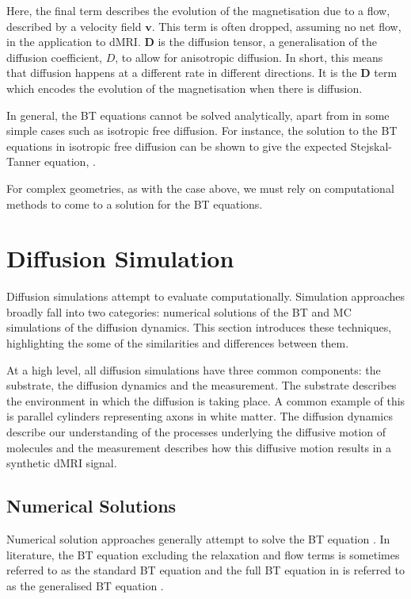 Here, the final term describes the evolution of the magnetisation due to a flow, described by a velocity field $\mathbf{v}$. This term is often dropped, assuming no net flow, in the application to \ac{dMRI}. 
$\mathbf{D}$ is the diffusion tensor, a generalisation of the diffusion coefficient, $D$, to allow for anisotropic diffusion. In short, this means that diffusion happens at a different rate in different directions.
It is the $\mathbf{D}$ term which encodes the evolution of the magnetisation when there is diffusion.

In general, the \ac{BT} equations cannot be solved analytically, apart from in some simple cases such as isotropic free diffusion.
For instance, the solution to the \ac{BT} equations in isotropic free diffusion can be shown to give the expected Stejskal-Tanner equation, .

For complex geometries, as with the case above, we must rely on computational methods to come to a solution for the \ac{BT} equations. 



\section{Diffusion Simulation}
\label{sec:diffusion_simulation}
Diffusion simulations attempt to evaluate  computationally. Simulation approaches broadly fall into two categories: numerical solutions of the \ac{BT} and \ac{MC} simulations of the diffusion dynamics. This section introduces these techniques, highlighting the some of the similarities and differences between them. 


At a high level, all diffusion simulations have three common components: the substrate, the diffusion dynamics and the measurement.
The substrate describes the environment in which the diffusion is taking place. A common example of this is parallel cylinders representing axons in white matter.
The diffusion dynamics describe our understanding of the processes underlying the diffusive motion of molecules and the measurement describes how this diffusive motion results in a synthetic \ac{dMRI} signal.
\subsection{Numerical Solutions}
\label{sec:numerical_solutions}
Numerical solution approaches generally attempt to solve the \acl{BT} equation \cite{Torrey1956}.
In literature, the \ac{BT} equation excluding the relaxation and flow terms is sometimes referred to as the standard \ac{BT} equation and the full \ac{BT} equation in  is referred to as the generalised \ac{BT} equation \cite{Beltrachini2016}. 

